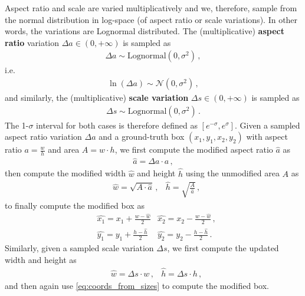 \documentclass[10pt,twocolumn,letterpaper]{article}
\begin{document}
Aspect ratio and scale are varied multiplicatively and we, therefore, sample from the normal distribution in log-space (of aspect ratio or scale variations). In other words, the variations are Lognormal distributed. The (multiplicative) \textbf{aspect ratio} variation $\Delta a \in (0, +\infty)$ is sampled as
\begin{align}
    \Delta a \sim \text{Lognormal}(0, \sigma^2)\,,
\end{align}
i.e.\
\begin{align}
    \ln(\Delta a) \sim \mathcal{N}(0, \sigma^2)\,,
\end{align}
and similarly, the (multiplicative) \textbf{scale variation} $\Delta s \in (0, +\infty)$ is sampled as
\begin{align}
    \Delta s \sim \text{Lognormal}(0, \sigma^2)\,.
\end{align}
The 1-$\sigma$ interval for both cases is therefore defined as $[e^{-\sigma}, e^\sigma]$.
Given a sampled aspect ratio variation $\Delta a$ and a ground-truth box $(x_1, y_1, x_2, y_2)$ with aspect ratio $a = \frac{w}{h}$ and area $A = w \cdot h$, we first compute the modified aspect ratio $\hat{a}$ as
\begin{align}
    \hat{a} = \Delta a \cdot a \,,
\end{align}
then compute the modified width $\hat{w}$ and height $\hat{h}$ using the unmodified area $A$ as
\begin{equation}
\begin{aligned}
    &\hat{w} = \sqrt{A \cdot \hat{a}}\,, 
    &\hat{h} = \sqrt{\frac{A}{\hat{a}}} \,,
\end{aligned}
\end{equation}
to finally compute the modified box as
\begin{equation}
\begin{aligned}
\label{eq:coords_from_sizes}
    &\hat{x_1} = x_1 + \frac{w - \hat{w}}{2}
    &\hat{x_2} = x_2 - \frac{w - \hat{w}}{2}\,,\\
    &\hat{y_1} = y_1 + \frac{h - \hat{h}}{2}
    &\hat{y_2} = y_2 - \frac{h - \hat{h}}{2} \,.
\end{aligned}
\end{equation}
Similarly, given a sampled scale variation $\Delta s$, we first compute the updated width and height  as
\begin{align}
    &\hat{w} = \Delta s \cdot w\,, 
    &\hat{h} = \Delta s \cdot h\,,
\end{align}
and then again use \eqref{eq:coords_from_sizes} to compute the modified box.
 
\end{document}
